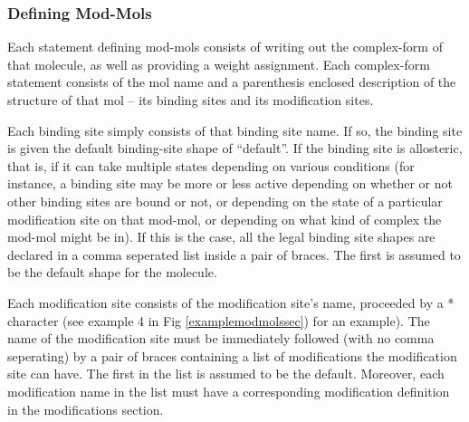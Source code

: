 \subsubsection{Defining Mod-Mols}
Each statement defining mod-mols consists of writing out the
complex-form of that molecule, as well as providing a weight
assignment.  Each complex-form statement consists of the mol name and
a parenthesis enclosed description of the structure of that mol -- its
binding sites and its modification sites. 

Each binding site simply consists of that binding site name.  If so,
the binding site is given the default binding-site shape of
``default''.  If the binding site is allosteric, that is, if it can
take multiple states depending on various conditions (for instance, a
binding site may be more or less active depending on whether or not
other binding sites are bound or not, or depending on the state of a
particular modification site on that mod-mol, or depending on what
kind of complex the mod-mol might be in).   If this is the case, all
the legal binding site shapes are declared in a comma seperated list
inside a pair of braces.  The first is assumed to be the default shape
for the molecule.

Each modification site consists of the modification site's name,
proceeded by a * character (see example 4 in Fig
\ref{examplemodmolssec}) for an example).  The name of the
modification site must be immediately followed (with no comma
seperating) by a pair of braces containing a list of modifications
the modification site can have.  The first in the list is assumed to
be the default.  Moreover, each modification name in the list must
have a corresponding modification definition in the modifications
section. 

